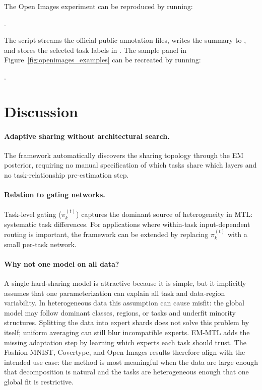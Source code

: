 \documentclass[preprint,12pt]{elsarticle}
\begin{document}
	The Open Images experiment can be reproduced by running:
	\begin{center}
	.
	\end{center}
	The script streams the official public annotation files, writes the
	summary to
	, and
	stores the selected task labels in
	.
	The sample panel in Figure~\ref{fig:openimages_examples} can be
	recreated by running:
	\begin{center}
	.
	\end{center}

	\section{Discussion}
	\label{sec:discussion}
	
	\paragraph{Adaptive sharing without architectural search.}
	The framework automatically discovers the sharing topology through
	the EM posterior, requiring no manual specification of which tasks
	share which layers and no task-relationship pre-estimation step.
	
	\paragraph{Relation to gating networks.}
	Task-level gating ($\pi_k^{(t)}$) captures the dominant source of
	heterogeneity in MTL: systematic task differences. For applications
	where within-task input-dependent routing is important, the framework
	can be extended by replacing $\pi_k^{(t)}$ with a small per-task network.

	\paragraph{Why not one model on all data?}
	A single hard-sharing model is attractive because it is simple, but it
	implicitly assumes that one parameterization can explain all task and
	data-region variability. In heterogeneous data this assumption can cause
	misfit: the global model may follow dominant classes, regions, or tasks
	and underfit minority structures. Splitting the data into expert shards
	does not solve this problem by itself; uniform averaging can still blur
	incompatible experts. EM-MTL adds the missing adaptation step by learning
	which experts each task should trust. The Fashion-MNIST, Covertype, and
	Open Images results therefore align with the intended use case: the
	method is most meaningful when the data are large enough that
	decomposition is natural and the tasks are heterogeneous enough that one
	global fit is restrictive.
	
\end{document}
